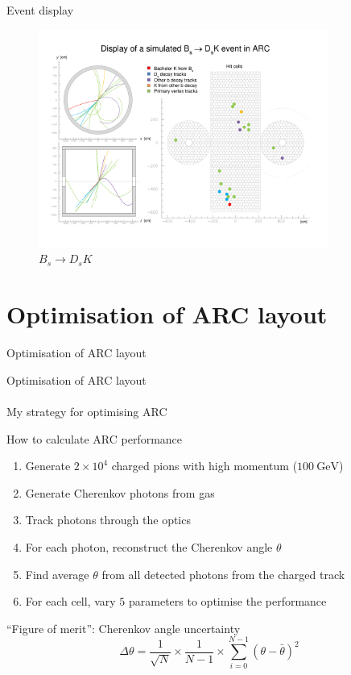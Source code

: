 \documentclass{beamer}
\begin{document}
\begin{frame}{Event display}
  \begin{figure}
    \centering
    \includegraphics[width = 0.85\textwidth, trim = {0cm 2cm 0cm 0cm}, clip = true]{Plots/Display2.pdf}
    \caption{$B_s\to D_sK$}
  \end{figure}
\end{frame}

\section{Optimisation of ARC layout}
\begin{frame}{Optimisation of ARC layout}
  \begin{center}
    {\huge Optimisation of ARC layout} \\~\\
    {\large My strategy for optimising ARC}
  \end{center}
\end{frame}

\begin{frame}{How to calculate ARC performance}
  \begin{enumerate}
    \setlength\itemsep{1.0em}
    \item{Generate $2\times10^4$ charged pions with high momentum ($\SI{100}{\giga\eV}$)}
    \item{Generate Cherenkov photons from gas}
    \item{Track photons through the optics}
    \item{For each photon, reconstruct the Cherenkov angle $\theta$}
    \item{Find average $\theta$ from all detected photons from the charged track}
    \item{For each cell, vary $5$ parameters to optimise the performance}
  \end{enumerate}
  \begin{block}{``Figure of merit'': Cherenkov angle uncertainty}
    \begin{equation*}
      \Delta\theta = \frac{1}{\sqrt{N}}\times\frac{1}{N - 1}\times\sum_{i = 0}^{N - 1}(\theta - \bar{\theta})^2
    \end{equation*}
  \end{block}
\end{frame}
\end{document}
